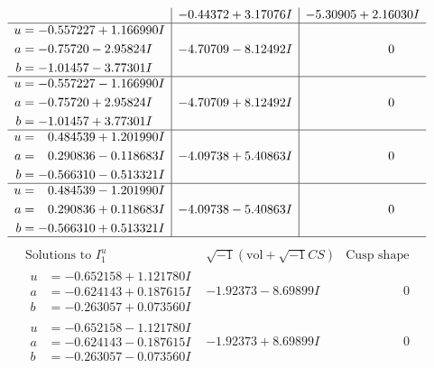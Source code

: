 \documentclass[1p]{elsarticle_modified}
\theoremstyle{definition}
\newcommand{\I}{\sqrt{-1}}
\begin{document}
$$\begin{array}{c|c|c}
 & -0.44372 + 3.17076 I & -5.30905 + 2.16030 I \\ \hline\begin{aligned}
u &= -0.557227 + 1.166990 I \\
a &= -0.75720 - 2.95824 I \\
b &= -1.01457 - 3.77301 I\end{aligned}
 & -4.70709 - 8.12492 I & \phantom{-0.000000 } 0 \\ \hline\begin{aligned}
u &= -0.557227 - 1.166990 I \\
a &= -0.75720 + 2.95824 I \\
b &= -1.01457 + 3.77301 I\end{aligned}
 & -4.70709 + 8.12492 I & \phantom{-0.000000 } 0 \\ \hline\begin{aligned}
u &= \phantom{-}0.484539 + 1.201990 I \\
a &= \phantom{-}0.290836 - 0.118683 I \\
b &= -0.566310 - 0.513321 I\end{aligned}
 & -4.09738 + 5.40863 I & \phantom{-0.000000 } 0 \\ \hline\begin{aligned}
u &= \phantom{-}0.484539 - 1.201990 I \\
a &= \phantom{-}0.290836 + 0.118683 I \\
b &= -0.566310 + 0.513321 I\end{aligned}
 & -4.09738 - 5.40863 I & \phantom{-0.000000 } 0\\
 \hline 
 \end{array}$$\newpage$$\begin{array}{c|c|c}  
\text{Solutions to }I^u_{1}& \I (\text{vol} + \sqrt{-1}CS) & \text{Cusp shape}\\
 \hline 
\begin{aligned}
u &= -0.652158 + 1.121780 I \\
a &= -0.624143 + 0.187615 I \\
b &= -0.263057 + 0.073560 I\end{aligned}
 & -1.92373 - 8.69899 I & \phantom{-0.000000 } 0 \\ \hline\begin{aligned}
u &= -0.652158 - 1.121780 I \\
a &= -0.624143 - 0.187615 I \\
b &= -0.263057 - 0.073560 I\end{aligned}
 & -1.92373 + 8.69899 I & \phantom{-0.000000 } 0 \\ \hline\begin{aligned}

\end{aligned}
\end{array}$$
\end{document}
